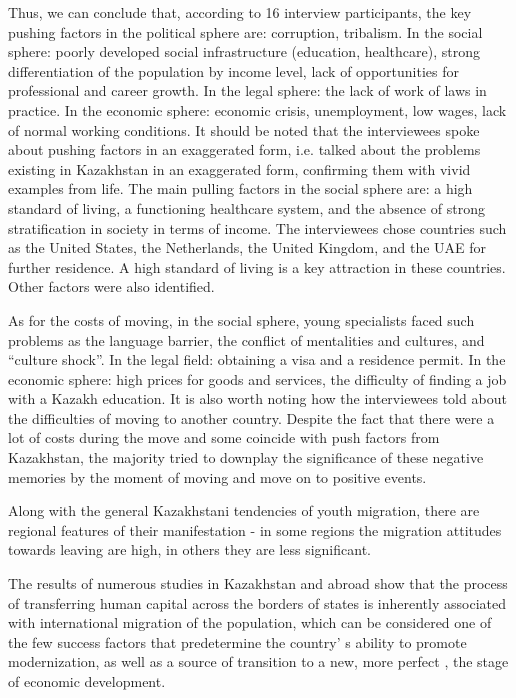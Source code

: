 Thus, we can conclude that, according to 16 interview participants, the
key pushing factors in the political sphere are: corruption, tribalism.
In the social sphere: poorly developed social infrastructure (education,
healthcare), strong differentiation of the population by income level,
lack of opportunities for professional and career growth. In the legal
sphere: the lack of work of laws in practice. In the economic sphere:
economic crisis, unemployment, low wages, lack of normal working
conditions. It should be noted that the interviewees spoke about pushing
factors in an exaggerated form, i.e. talked about the problems existing
in Kazakhstan in an exaggerated form, confirming them with vivid
examples from life. The main pulling factors in the social sphere are: a
high standard of living, a functioning healthcare system, and the
absence of strong stratification in society in terms of income. The
interviewees chose countries such as the United States, the Netherlands,
the United Kingdom, and the UAE for further residence. A high standard
of living is a key attraction in these countries. Other factors were
also identified.

As for the costs of moving, in the social sphere, young specialists
faced such problems as the language barrier, the conflict of mentalities
and cultures, and ``culture shock''. In the legal field: obtaining a
visa and a residence permit. In the economic sphere: high prices for
goods and services, the difficulty of finding a job with a Kazakh
education. It is also worth noting how the interviewees told about the
difficulties of moving to another country. Despite the fact that there
were a lot of costs during the move and some coincide with push factors
from Kazakhstan, the majority tried to downplay the significance of
these negative memories by the moment of moving and move on to positive
events.

Along with the general Kazakhstani tendencies of youth migration, there
are regional features of their manifestation - in some regions the
migration attitudes towards leaving are high, in others they are less
significant.

The results of numerous studies in Kazakhstan and abroad show that the
process of transferring human capital across the borders of states is
inherently associated with international migration of the population,
which can be considered one of the few success factors that predetermine
the country' s ability to promote modernization, as well
as a source of transition to a new, more perfect , the stage of economic
development.

